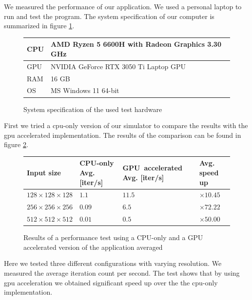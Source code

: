 We measured the performance of our application.
We used a personal laptop to run and test the program.
The system specification of our computer is summarized in figure \ref{fig:system_spec}.
\begin{figure}
	\begin{center}
		\begin{tabular}{|m{5em}||m{25em}|}
			\hline
			CPU & AMD Ryzen 5 6600H with Radeon Graphics            3.30 GHz\\
			\hline
			GPU & NVIDIA GeForce RTX 3050 Ti Laptop GPU\\		
			\hline
			RAM & 16 GB\\		
			\hline
			OS & MS Windows 11 64-bit\\		
			\hline
		\end{tabular}
		\caption{System specification of the used test hardware}
		\label{fig:system_spec}
	\end{center}
\end{figure}
First we tried a \acrshort{cpu}-only version of our simulator to compare the results with the \acrshort{gpu} accelerated implementation.
The results of the comparison can be found in figure \ref{fig:performance_test}.
\begin{figure}
	\begin{center}
	\begin{tabular}{|m{8em}||m{8em}| m{8em}| m{4em}|}
		\hline
		Input size & CPU-only Avg. [iter/s] & GPU~accelerated Avg. [iter/s] & Avg. speed up\\
		\hline
		$128 \times 128 \times 128$ & $1.1$ & $11.5$ & $\times 10.45$\\
		\hline
		$256 \times 256 \times 256$ & $0.09$ & $6.5$ & $\times 72.22$\\
		\hline
		$512 \times 512 \times 512$ & $0.01$ & $0.5$ & $\times 50.00$\\
		\hline
	\end{tabular}
	\caption{Results of a performance test using a CPU-only and a GPU accelerated version of the application averaged}
	\label{fig:performance_test}
\end{center}
\end{figure}
Here we tested three different configurations with varying resolution.
We measured the average iteration count per second.
The test shows that by using \acrshort{gpu} acceleration we obtained significant speed up over the the \acrshort{cpu}-only implementation.






